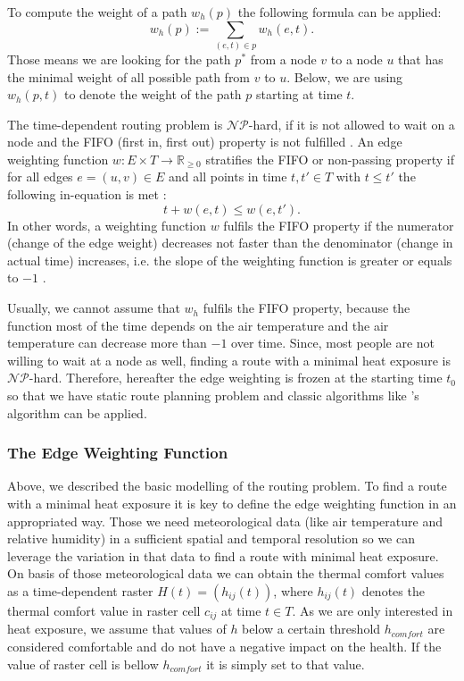 To compute the weight of a path $w_h(p)$ the following formula can be applied:
	\begin{equation}\label{eq:path-weight}
		w_h(p) := \sum_{(e,t) \in p} w_h(e, t).
	\end{equation}
Those means we are looking for the path $p^*$ from a node $v$ to a node $u$ that has the minimal weight of all possible path from $v$ to $u$. Below, we are using $w_h(p, t)$ to denote the weight of the path $p$ starting at time $t$. 

The time-dependent routing problem is $\mathcal{NP}$-hard, if it is not allowed to wait on a node and the FIFO (first in, first out) property is not fulfilled \parencite{Orda1990}. An edge weighting function $w: E \times T \to \mathbb{R}_{\geq 0}$ stratifies the FIFO or non-passing property if for all edges $e=(u,v)\in E$ and all points in time $t, t' \in T$ with $t \leq t'$ the following in-equation is met \parencite{Ahn1991}:
   \begin{equation}\label{eq:fifo-property}
  	 t + w(e,t) \leq w(e, t').
   \end{equation}
In other words, a weighting function $w$ fulfils the FIFO property if the numerator (change of the edge weight)
decreases not faster than the denominator (change in actual time) increases, i.e. the slope of the weighting function is greater or equals to $-1$ \parencite{Kaufman1993}.  

Usually, we cannot assume that $w_h$ fulfils the FIFO property, because the function most of the time depends on the air temperature and the air temperature can decrease more than $-1$ over time. Since, most people are not willing to wait at a node as well, finding a route with a minimal heat exposure is $\mathcal{NP}$-hard. Therefore, 
hereafter the edge weighting is frozen at the starting time $t_0$ so that we have static route planning problem and classic algorithms like  \citeauthor{Dijkstra1959}'s algorithm \parencite{Dijkstra1959} can be applied. 

\subsubsection{The Edge Weighting Function}

Above, we described the basic modelling of the routing problem. To find a route with a minimal heat exposure it is key to define the edge weighting function in an appropriated way. Those we need meteorological data (like air temperature and relative humidity) in a sufficient spatial and temporal resolution so we can leverage the variation in that data to find a route with minimal heat exposure. On basis of those meteorological data we can obtain the thermal comfort values as a time-dependent raster $H(t) = \left(h_{ij}(t)\right)$, where $h_{ij}(t)$ denotes the thermal comfort value in raster cell $c_{ij}$ at time $t \in T$. As we are only interested in heat exposure, we assume that values of $h$ below a certain threshold $h_{comfort}$ \parencite[e.g. \SI{20}{\celsius}, cf.][]{Jendritzky2000} are considered comfortable and do not have a negative impact on the health. If the value of raster cell is bellow $h_{comfort}$ it is simply set to that value.

